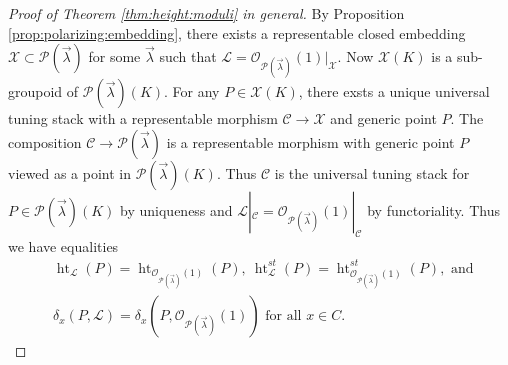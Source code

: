 \documentclass[a4paper,12pt]{amsart}
\theoremstyle{definition}
\newcommand{\cX}{\mathcal{X}}
\newcommand{\cO}{\mathcal{O}}
\newcommand{\cC}{\mathcal{C}}
\newcommand{\cL}{\mathcal{L}}
\DeclareMathOperator{\height}{ht}
\newcommand{\Pcv}{\mathcal{P}(\vec{\lambda})}
\newcommand{\lambdavec}{{\vec{\lambda}}}
\begin{document}
	\begin{proof}[Proof of Theorem \ref{thm:height:moduli} in general]
		By Proposition \ref{prop:polarizing:embedding}, there exists a representable closed embedding $\cX \subset \Pcv$ for some $\lambdavec$ such that $\cL = \cO_{\Pcv}(1)|_\cX$. Now $\cX(K)$ is a sub-groupoid of $\Pcv(K)$. For any $P \in \cX(K)$, there exsts a unique universal tuning stack with a representable morphism $\cC \to \cX$ and generic point $P$. The composition $\cC \to \Pcv$ is a representable morphism with generic point $P$ viewed as a point in $\Pcv(K)$. Thus $\cC$ is the universal tuning stack for $P \in \Pcv(K)$ by uniqueness and $\cL|_{\cC} = \cO_{\Pcv}(1)|_{\cC}$ by functoriality. Thus we have equalities
		\begin{align*}
			&\height_{\cL}(P) = \height_{\cO_{\Pcv}(1)}(P), \ \height^{st}_{\cL}(P) = \height^{st}_{\cO_{\Pcv}(1)}(P), \text{ and } \\ & \delta_x(P, \cL) = \delta_x(P, \cO_{\Pcv}(1)) \text{ for all }x \in C. 
		\end{align*}
		

\end{proof}
\end{document}
